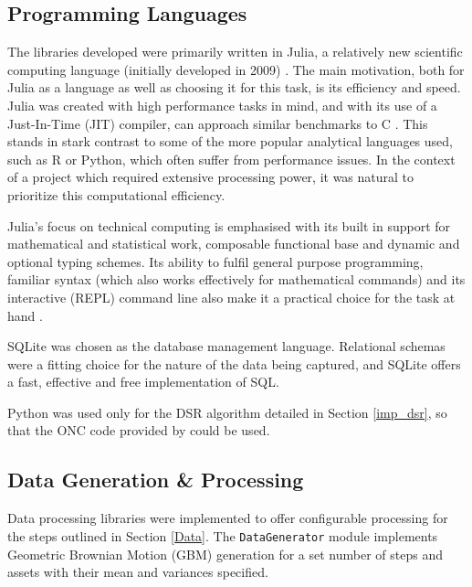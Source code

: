 \documentclass[a4paper,11pt,oneside]{article}
\theoremstyle{plain}
\theoremstyle{definition}
\begin{document}
	
	\subsection{Programming Languages}
	
	The libraries developed were primarily written in Julia, a relatively new scientific computing language (initially developed in 2009) \citep{DCCodeBase, Julia}. The main motivation, both for Julia as a language as well as choosing it for this task, is its efficiency and speed. Julia was created with high performance tasks in mind, and with its use of a Just-In-Time (JIT) compiler, can approach similar benchmarks to C \citep{Perkel}. This stands in stark contrast to some of the more popular analytical languages used, such as R or Python, which often suffer from performance issues. In the context of a project which required extensive processing power, it was natural to prioritize this computational efficiency. \newline
	
	Julia's focus on technical computing is emphasised with its built in support for mathematical and statistical work, composable functional base and dynamic and optional typing schemes. Its ability to fulfil general purpose programming, familiar syntax (which also works effectively for mathematical commands) and its interactive (REPL) command line also make it a practical choice for the task at hand \citep{Perkel}.\newline
	
	SQLite was chosen as the database management language. Relational schemas were a fitting choice for the nature of the data being captured, and SQLite offers a fast, effective and free implementation of SQL.\newline
	
	Python was used only for the DSR algorithm detailed in Section \ref{imp_dsr}, so that the ONC code provided by \citet{PradoDSR} could be used.\newline
	
	\subsection{Data Generation \& Processing}
	
	Data processing libraries were implemented to offer configurable processing for the steps outlined in Section \ref{Data}. The \texttt{DataGenerator} module \citep{DCDataGenerator} implements Geometric Brownian Motion (GBM) generation for a set number of steps and assets with their mean and variances specified. \newline
	
\end{document}
